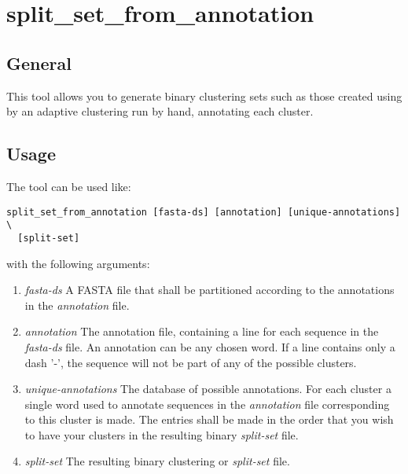 \section{split\_set\_from\_annotation} \label{sec-ssannotation}

\subsection{General}

This tool allows you to generate binary clustering sets such as those created
using by an adaptive clustering run by hand, annotating each cluster.

\subsection{Usage}
The tool can be used like:
\begin{lstlisting}
split_set_from_annotation [fasta-ds] [annotation] [unique-annotations] \
  [split-set]
\end{lstlisting}
with the following arguments:
\begin{enumerate}
\item \emph{fasta-ds} A FASTA file that shall be partitioned according to the
  annotations in the \emph{annotation} file.
\item \emph{annotation} The annotation file, containing a line for each
  sequence in the \emph{fasta-ds} file. An annotation can be any chosen word.
  If a line contains only a dash '-', the sequence will not be part of any of
  the possible clusters.
\item \emph{unique-annotations} The database of possible annotations.
  For each cluster a single word used to annotate sequences in the
  \emph{annotation} file corresponding to this cluster is made.
  The entries shall be made in the order that you wish
  to have your clusters in the resulting binary \emph{split-set} file.
\item \emph{split-set} The resulting binary clustering or \emph{split-set}
  file.
\end{enumerate}
